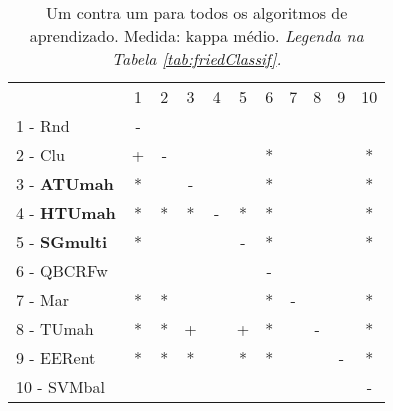 \begin{table}[h]
\caption{Um contra um para todos os algoritmos de aprendizado. Medida: kappa médio. \textit{Legenda na Tabela \ref{tab:friedClassif}.}}
\begin{center}\begin{tabular}{lcc|cc|cc|cc|cc}
 			& 1 & 2 & 3 & 4 & 5 & 6 & 7 & 8 & 9 & 10\\
1 - Rnd  	& - &   &   &   &   &   &   &   &   &   \\
2 - Clu  	& + & - &   &   &   & * &   &   &   & * \\ \hline
3 - \textbf{ATUmah}	& * &   & - &   &   & * &   &   &   & * \\
4 - \textbf{HTUmah}	& * & * & * & - & * & * &   &   &   & * \\ \hline
5 - \textbf{SGmulti}	& * &   &   &   & - & * &   &   &   & * \\
6 - QBCRFw	&   &   &   &   &   & - &   &   &   &   \\ \hline
7 - Mar  	& * & * &   &   &   & * & - &   &   & * \\
8 - TUmah	& * & * & + &   & + & * &   & - &   & * \\ \hline
9 - EERent	& * & * & * &   & * & * &   &   & - & * \\
10 - SVMbal	&   &   &   &   &   &   &   &   &   & - \\ \hline\end{tabular}
\label{stratsALCKappaFriedAllall}
\end{center}
\end{table}